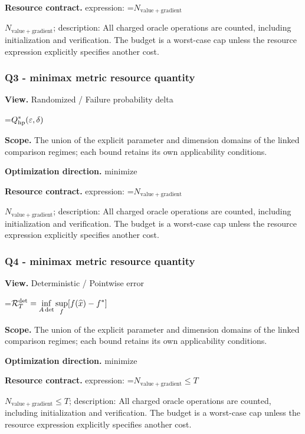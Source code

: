 \documentclass[10pt,a4paper]{article}
\newcommand{\AtlasMath}[1]{\par\begingroup\centering\setbox0=\hbox{$\displaystyle #1$}\ifdim\wd0>1.4\linewidth\typeout{ATLAS WIDE FORMULA: \the\wd0}\fi\ifdim\wd0>\linewidth\resizebox{\linewidth}{!}{\box0}\else\box0\fi\par\endgroup}
\newcommand{\AtlasInlineMath}[1]{\begingroup\setbox0=\hbox{$#1$}\ifdim\wd0>.4\linewidth\endgroup\AtlasMath{#1}\else\endgroup$#1$\fi}
\begin{document}
\textbf{Resource contract.} expression: \AtlasInlineMath{N_{\mathrm{value+gradient}}}; description: All charged oracle operations are counted, including initialization and verification. The budget is a worst-case cap unless the resource expression explicitly specifies another cost.



\subsubsection{Q3 - minimax metric resource quantity}


\textbf{View.} Randomized / Failure probability delta



\AtlasMath{Q^*_{\rm hp}(\varepsilon,\delta)}


\textbf{Scope.} The union of the explicit parameter and dimension domains of the linked comparison regimes; each bound retains its own applicability conditions.



\textbf{Optimization direction.} minimize



\textbf{Resource contract.} expression: \AtlasInlineMath{N_{\mathrm{value+gradient}}}; description: All charged oracle operations are counted, including initialization and verification. The budget is a worst-case cap unless the resource expression explicitly specifies another cost.



\subsubsection{Q4 - minimax metric resource quantity}


\textbf{View.} Deterministic / Pointwise error



\AtlasMath{\mathcal R_T^{\rm det}=\inf_{A\,\rm det}\sup_f[f(\widehat x)-f^*]}


\textbf{Scope.} The union of the explicit parameter and dimension domains of the linked comparison regimes; each bound retains its own applicability conditions.



\textbf{Optimization direction.} minimize



\textbf{Resource contract.} expression: \AtlasInlineMath{N_{\mathrm{value+gradient}}\le T}; description: All charged oracle operations are counted, including initialization and verification. The budget is a worst-case cap unless the resource expression explicitly specifies another cost.
\end{document}
